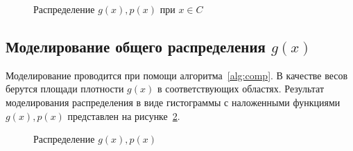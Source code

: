 \documentclass[12pt, specialist, subf, substylefile = spbu.rtx]{disser}
\begin{document}
\begin{figure}[h]
\caption{Распределение $g(x), p(x)$ при $x \in C$}
\label{ris:sectionC}
\end{figure}



\subsection{Моделирование общего распределения $g(x)$}

Моделирование проводится при помощи алгоритма~\ref{alg:comp}. В качестве весов берутся площади плотности $g(x)$ в соответствующих областях. Результат моделирования распределения в виде гистограммы с наложенными функциями $g(x), p(x)$ представлен на рисунке~\ref{ris:sectionAll}. 

\begin{figure}[h]
\caption{Распределение $g(x), p(x)$}
\label{ris:sectionAll}
\end{figure}
\end{document}
